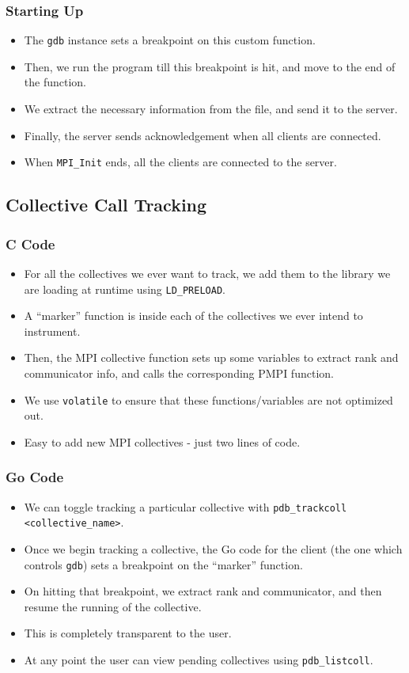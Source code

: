 \documentclass{beamer}
\begin{document}
\begin{frame}
  \frametitle{Starting Up}
  \begin{itemize}
  \item <1-> The \texttt{gdb} instance sets a breakpoint on this custom function.
  \item <2-> Then, we run the program till this breakpoint is hit, and move to the end of the function.
  \item <3-> We extract the necessary information from the file, and send it to the server.
  \item <4-> Finally, the server sends acknowledgement when all clients are connected.
  \item <5-> When \texttt{MPI\_Init} ends, all the clients are connected to the server.
 \end{itemize}
\end{frame}

\subsection{Collective Call Tracking}
\begin{frame}
  \frametitle{C Code}
 \begin{itemize}
 \item <1-> For all the collectives we ever want to track, we add them to the library we are loading at runtime using \texttt{LD\_PRELOAD}.
 \item <2-> A ``marker'' function is inside each of the collectives we ever intend to instrument.
 \item <3-> Then, the MPI collective function sets up some variables to extract rank and communicator info, and calls the corresponding PMPI function.
 \item <4-> We use \texttt{volatile} to ensure that these functions/variables are not optimized out.
 \item <5-> Easy to add new MPI collectives - just two lines of code.
 \end{itemize}
\end{frame}

\begin{frame}
  \frametitle{Go Code}
  \begin{itemize}
  \item <1-> We can toggle tracking a particular collective with \texttt{pdb\_trackcoll <collective\_name>}.
  \item <2-> Once we begin tracking a collective, the Go code for the client (the one which controls \texttt{gdb}) sets a breakpoint on the ``marker'' function.
  \item <3-> On hitting that breakpoint, we extract rank and communicator, and then resume the running of the collective.
  \item <4-> This is completely transparent to the user.
  \item <5-> At any point the user can view pending collectives using \texttt{pdb\_listcoll}.
 \end{itemize}
\end{frame}
\end{document}
